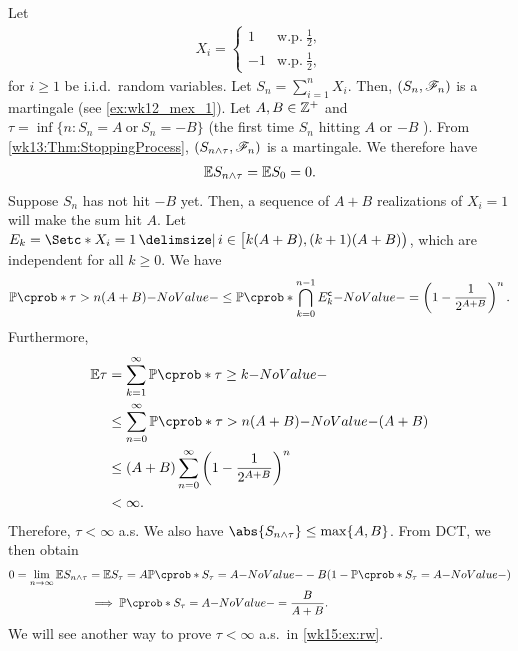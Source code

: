 \documentclass[12pt]{article}
\begin{document}
\begin{Example}\label{wk13:ex:rw}
Let
\begin{align*}
X_i = 
\begin{cases} 
1 & \text{w.p.}\ \frac{1}{2}, \\ 
-1 & \text{w.p.}\ \frac{1}{2}, 
\end{cases}
\end{align*}
for $i \geq 1$ be i.i.d.\ random variables. Let $S_n = \sum_{i=1}^n X_i$. Then, $\left(S_n, \mathscr{F}_n \right)$ is a martingale (see \cref{ex:wk12_mex_1}).
Let $A, B \in \mathbb{Z}^+$ and $\tau = \inf \{n: S_n=A \ \text{or}\ S_n=-B\}$ (the first time $S_n$ hitting $A$ or $-B$ ). From \cref{wk13:Thm:StoppingProcess}, $\left(S_{n \wedge \tau}, \mathscr{F}_n\right)$ is a martingale. We therefore have
\begin{align*}
\E S_{n \wedge \tau} = \E S_0 = 0.
\end{align*}
Suppose $S_n$ has not hit $-B$ yet. Then, a sequence of $A+B$ realizations of $X_i=1$ will make the sum hit $A$. Let $E_k = \set*{X_i=1\given i \in \big[k(A+B), (k+1)(A+B)\big)}$, which are independent for all $k\geq0$. We have
\begin{align*}
\P(\tau > n(A+B)) \leq \P(\bigcap_{k=0}^{n-1} E_k\setcomp) = \left(1 - \frac{1}{2^{A+B}}\right)^n.
\end{align*}
Furthermore, 
\begin{align*}
\E \tau &= \sum_{k=1}^\infty \P(\tau \geq k) \\
&\leq \sum_{n=0}^\infty \P(\tau > n(A+B))(A+B) \\
&\leq (A+B) \sum_{n=0}^\infty \left(1 - \frac{1}{2^{A+B}}\right)^n \\
&< \infty. 
\end{align*}
Therefore, $\tau < \infty$ a.s. We also have $\abs{S_{n \wedge \tau}} \leq \max \{A, B\}$. From DCT, we then obtain
\begin{align*}
0= \lim_{n \to \infty} \E S_{n \wedge \tau}
&= \E S_\tau 
= A\P(S_\tau = A) - B(1 - \P(S_\tau = A))\\
&\implies
\P(S_\tau = A) = \frac{B}{A+B}.
\end{align*}
We will see another way to prove $\tau<\infty$ a.s.\ in \cref{wk15:ex:rw}.
\end{Example}
\end{document}

